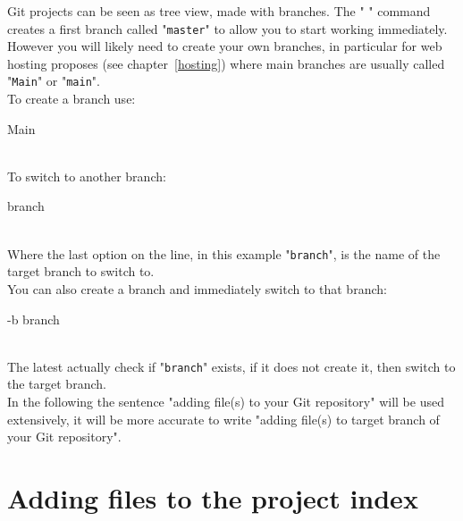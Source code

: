 Git projects can be seen as tree view, made with branches. The " " command creates a first branch called "\texttt{master}" 
to allow you to start working immediately. 
However you will likely need to create your own branches, in particular for web hosting proposes (see chapter~\ref{hosting})
where main branches are usually called "\texttt{Main}" or "\texttt{main}". \\[0.25cm]
To create a branch use: 
\begin{script}
    Main
\end{script} \\[-0.75cm]
\noindent To switch to another branch: 
\begin{script}
   branch
\end{script} \\[-0.75cm]
\noindent Where the last option on the line, in this example "\texttt{branch}", is the name of the target branch to switch to. \\
You can also create a branch and immediately switch to that branch:
\begin{script}
   -b branch
\end{script} \\[-0.75cm]
\noindent The latest actually check if "\texttt{branch}" exists, if it does not create it, then switch to the target branch. \\
In the following the sentence "adding file(s) to your Git repository" will be used extensively, it will be more accurate to write 
"adding file(s) to target branch of your Git repository". 

\section{Adding files to the project index}

